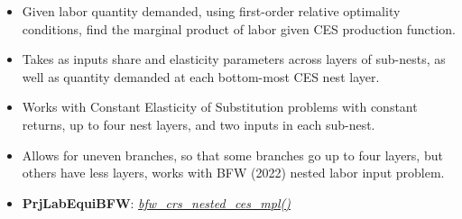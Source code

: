 \documentclass[
]{book}
\providecommand{\tightlist}{%
  \setlength{\itemsep}{0pt}\setlength{\parskip}{0pt}}
\begin{document}
\begin{enumerate}
  \begin{itemize}
  \tightlist
  \item
    Given labor quantity demanded, using first-order relative optimality conditions, find the marginal product of labor given CES production function.
  \item
    Takes as inputs share and elasticity parameters across layers of sub-nests, as well as quantity demanded at each bottom-most CES nest layer.
  \item
    Works with Constant Elasticity of Substitution problems with constant returns, up to four nest layers, and two inputs in each sub-nest.
  \item
    Allows for uneven branches, so that some branches go up to four layers, but others have less layers, works with BFW (2022) nested labor input problem.
  \item
    \textbf{PrjLabEquiBFW}: \emph{\href{https://github.com/FanWangEcon/PrjLabEquiBFW/blob/main/PrjLabEquiBFW/solvedemand/bfw_crs_nested_ces_mpl.m}{bfw\_crs\_nested\_ces\_mpl()}}
  \end{itemize}
\end{enumerate}

  
\end{document}
